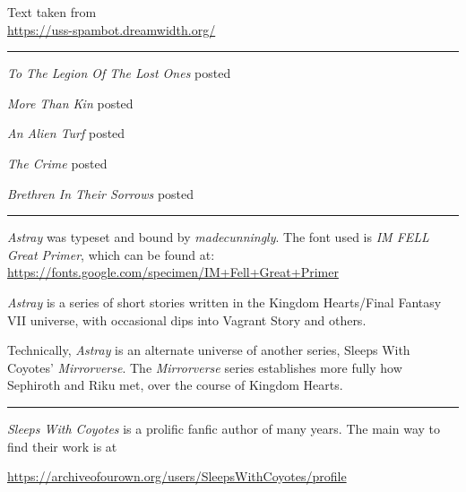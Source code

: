 \documentclass[a5paper,12pt,twoside,onecolumn,openright,showtrim,draft]{memoir}
\begin{document}
\clearpage
\thispagestyle{plain}
\begin{flushleft}
\begin{SingleSpace} 


  Text taken from\\ \url{https://uss-spambot.dreamwidth.org/}

  \pfbreak

  \textit{To The Legion Of The Lost Ones} posted 

  \textit{More Than Kin} posted 

  \textit{An Alien Turf} posted 

  \textit{The Crime} posted 

  \textit{Brethren In Their Sorrows} posted  

  \pfbreak

  \textit{Astray} was typeset and bound by \emph{madecunningly}. 
  The font used is \textit{IM FELL Great Primer}, which can be found at:\\ \url{https://fonts.google.com/specimen/IM+Fell+Great+Primer}

\end{SingleSpace}
\end{flushleft}
\clearpage
\thispagestyle{plain}
\begin{SingleSpace}
\begin{midsloppypar}
\textit{Astray} is a series of short stories written in the Kingdom Hearts/Final Fantasy VII universe, with occasional dips into Vagrant Story and others. 

Technically,  \textit{Astray} is an alternate universe of another series, Sleeps 
With Coyotes' \textit{Mirrorverse}. The \textit{Mirrorverse} series establishes more fully how Sephiroth and Riku met, over the course of Kingdom Hearts.  

\pfbreak

\textit{Sleeps With Coyotes} is a prolific fanfic author of many years. The main way to find their work is at 

\url{https://archiveofourown.org/users/SleepsWithCoyotes/profile}
\end{midsloppypar}
\end{SingleSpace}



\cleartorecto
\thispagestyle{plain}


\clearpage
\cleartorecto
\end{document}
